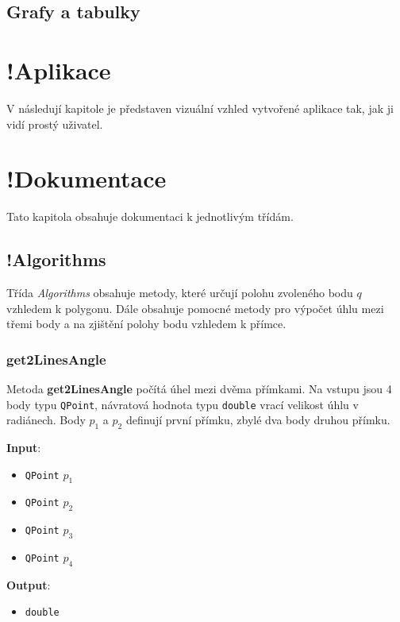 \documentclass[a4paper, 12pt]{article}
\begin{document}
\subsection{Grafy a tabulky}

\clearpage
\section{!Aplikace}
V následují kapitole je představen vizuální vzhled vytvořené aplikace tak, jak ji vidí prostý uživatel.


\clearpage
 
\section{!Dokumentace}
Tato kapitola obsahuje dokumentaci k jednotlivým třídám.

\subsection{!Algorithms}
Třída \textsl{Algorithms} obsahuje metody, které určují polohu zvoleného bodu $q$ vzhledem k polygonu. Dále obsahuje pomocné metody pro výpočet úhlu mezi třemi body a na zjištění polohy bodu vzhledem k přímce. 

\subsubsection{get2LinesAngle}
Metoda \textbf{get2LinesAngle} počítá úhel mezi dvěma přímkami. Na vstupu jsou 4 body typu \texttt{QPoint}, návratová hodnota typu \texttt{double} vrací velikost úhlu v radiánech. Body $p_1$ a $p_2$ definují první přímku, zbylé dva body druhou přímku. 

\textbf{Input}:
\begin{itemize}
\item \texttt{QPoint} $p_1$ 
\item \texttt{QPoint} $p_2$ 
\item \texttt{QPoint} $p_3$
\item \texttt{QPoint} $p_4$
\end{itemize}

\textbf{Output}:
\begin{itemize}
\item \texttt{double} 
\end{itemize}
\end{document}
